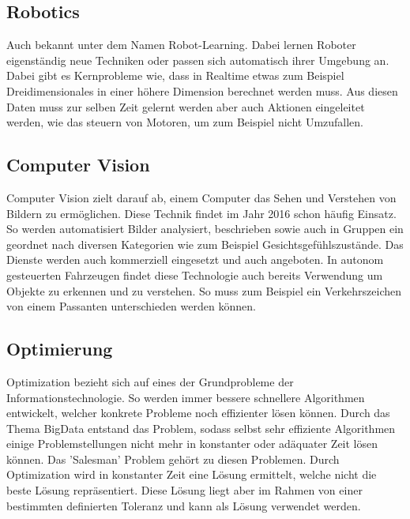 \subsection{Robotics}
\label{subsec:Robotics}

Auch bekannt unter dem Namen Robot-Learning. 
Dabei lernen Roboter eigenständig neue Techniken oder passen sich automatisch ihrer Umgebung an. 
Dabei gibt es Kernprobleme wie, dass in Realtime etwas zum Beispiel Dreidimensionales in einer höhere Dimension berechnet werden muss.
Aus diesen Daten muss zur selben Zeit gelernt werden aber auch Aktionen eingeleitet werden, wie das steuern von Motoren, um zum Beispiel nicht Umzufallen.

\subsection{Computer Vision}
\label{subsec:Cumputer Vision}

Computer Vision zielt darauf ab, einem Computer das Sehen und Verstehen von Bildern zu ermöglichen. 
Diese Technik findet im Jahr 2016 schon häufig Einsatz. 
So werden automatisiert Bilder analysiert, beschrieben sowie auch in Gruppen ein geordnet nach diversen Kategorien wie zum Beispiel Gesichtsgefühlszustände.
Das Dienste werden auch kommerziell eingesetzt und auch angeboten. 
In autonom gesteuerten Fahrzeugen findet diese Technologie auch bereits Verwendung um Objekte zu erkennen und zu verstehen. 
So muss zum Beispiel ein Verkehrszeichen von einem Passanten unterschieden werden können.

\subsection{Optimierung}
\label{subsec:Optimization}

Optimization bezieht sich auf eines der Grundprobleme der Informationstechnologie. 
So werden immer bessere schnellere Algorithmen entwickelt, welcher konkrete Probleme noch effizienter lösen können. 
Durch das Thema BigData entstand das Problem, sodass selbst sehr effiziente Algorithmen einige Problemstellungen nicht mehr in konstanter oder adäquater Zeit lösen können. 
Das 'Salesman' Problem gehört zu diesen Problemen. 
Durch Optimization wird in konstanter Zeit eine Lösung ermittelt, welche nicht die beste Lösung repräsentiert. 
Diese Lösung liegt aber im Rahmen von einer bestimmten definierten Toleranz und kann als Lösung verwendet werden. \cite{AI3}

